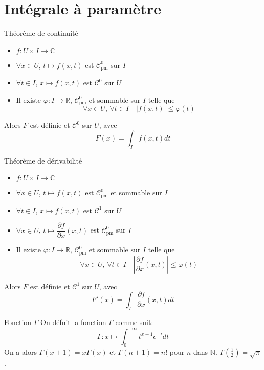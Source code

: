 \documentclass[french, a4paper, 10pt, twocolumn]{article}
\newcommand{\N}{\mathbb{N}}   %
\newcommand{\R}{\mathbb{R}}   %
\newcommand{\C}{\mathbb{C}}   %
\newcommand{\czero}{\mathcal{C}^{0}}
\newcommand{\cun}{\mathcal{C}^{1}}
\renewcommand{\phi}{\varphi}
\begin{document}
\section{Intégrale à paramètre}
\begin{theoreme}{Théorème de continuité}
  \begin{itemize}[label=\(\bullet\)]
    \item \(f:U\times I\rightarrow\C\)
    \item \(\forall x\in U\), \(t\mapsto f(x,t)\) est \(\czero_{\text{pm}}\) sur \(I\)
    \item \(\forall t \in I\), \(x\mapsto f(x,t)\) est \(\czero\) sur \(U\)
    \item Il existe \(\phi : I\rightarrow \R\), \(\czero_{\text{pm}}\) et sommable sur \(I\) telle que
      \[\forall x\in U,\,\forall t\in I\quad \vert f(x,t)\vert\leqslant\phi(t)\]
  \end{itemize}
  \tcblower
  Alors \(F\) est définie et \(\czero\) sur \(U\), avec
  \[F(x)=\int_{I}f(x,t)dt\]
\end{theoreme}

\begin{theoreme}{Théorème de dérivabilité}
  \begin{itemize}[label=\(\bullet\)]
    \item \(f:U\times I\rightarrow\C\)
    \item \(\forall x\in U\), \(t\mapsto f(x,t)\) est \(\czero_{\text{pm}}\) et sommable sur \(I\)
    \item \(\forall t \in I\), \(x\mapsto f(x,t)\) est \(\cun\) sur \(U\)
    \item \(\forall x\in U\), \(t\mapsto \dfrac{\partial f}{\partial x}(x,t)\) est \(\czero_{\text{pm}}\) sur \(I\)
    \item Il existe \(\phi : I\rightarrow \R\), \(\czero_{\text{pm}}\) et sommable sur \(I\) telle que
      \[\forall x\in U,\,\forall t\in I\quad \left\vert\dfrac{\partial f}{\partial x}(x,t)\right\vert\leqslant\phi(t)\]
  \end{itemize}
  \tcblower
  Alors \(F\) est définie et \(\cun\) sur \(U\), avec
  \[F'(x)=\int_{I}\dfrac{\partial f}{\partial x}(x,t)dt\]
\end{theoreme}

\begin{theoreme}{Fonction \(\Gamma\)}
  On défnit la fonction \(\Gamma\) comme suit:
  \[\Gamma:x\mapsto\int_{0}^{+\infty}t^{x-1}e^{-t}dt\]
  On a alors \(\Gamma(x+1)=x\Gamma(x)\) et \(\Gamma(n+1)=n!\) pour \(n\) dans \(\N\). \(\Gamma(\frac{1}{2})=\sqrt{\pi}\).
\end{theoreme}
\end{document}
